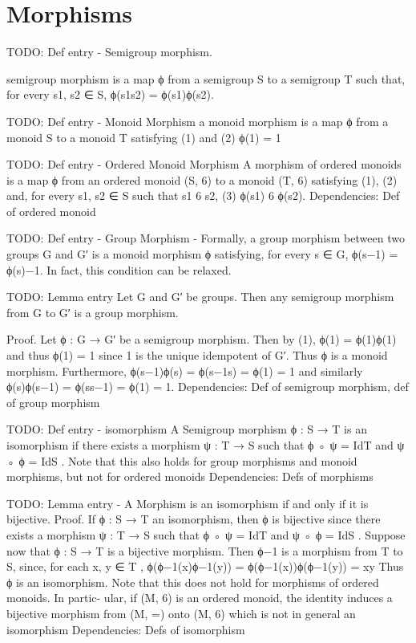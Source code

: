 \chapter {Morphisms}

TODO: Def entry - Semigroup morphism.

 semigroup morphism is a map ϕ from a
semigroup S to a semigroup T such that, for every s1, s2 ∈ S, 
ϕ(s1s2) = ϕ(s1)ϕ(s2).

TODO: Def entry - Monoid Morphism
a monoid morphism is a map ϕ from a monoid S to a monoid T
satisfying (1) and
(2) ϕ(1) = 1

TODO: Def entry - Ordered Monoid Morphism
A morphism of ordered monoids is a map ϕ from an ordered monoid (S, 6) to
a monoid (T, 6) satisfying (1), (2) and, for every s1, s2 ∈ S such that s1 6 s2,
(3) ϕ(s1) 6 ϕ(s2).
Dependencies: Def of ordered monoid

TODO: Def entry - Group Morphism - Formally, a group morphism between two groups G and G′ is a monoid morphism
ϕ satisfying, for every s ∈ G, ϕ(s−1) = ϕ(s)−1. In fact, this condition can be
relaxed. 

TODO: Lemma entry 
Let G and G′ be groups. Then any semigroup morphism
from G to G′ is a group morphism.

Proof. Let ϕ : G → G′ be a semigroup morphism. Then by (1), ϕ(1) = ϕ(1)ϕ(1)
and thus ϕ(1) = 1 since 1 is the unique idempotent of G′. Thus ϕ is a monoid
morphism. Furthermore, ϕ(s−1)ϕ(s) = ϕ(s−1s) = ϕ(1) = 1 and similarly
ϕ(s)ϕ(s−1) = ϕ(ss−1) = ϕ(1) = 1.
Dependencies: Def of semigroup morphism, def of group morphism

TODO: Def entry - isomorphism
 A Semigroup morphism ϕ : S → T is an isomorphism if there exists a morphism ψ :
T → S such that ϕ ◦ ψ = IdT and ψ ◦ ϕ = IdS .
Note that this also holds for group morphisms and monoid morphisms, but not for ordered monoids
Dependencies: Defs of morphisms

TODO: Lemma entry - A Morphism is an isomorphism if and only if it is bijective.
Proof. If ϕ : S → T an isomorphism, then ϕ is bijective since there exists a
morphism ψ : T → S such that ϕ ◦ ψ = IdT and ψ ◦ ϕ = IdS .
Suppose now that ϕ : S → T is a bijective morphism. Then ϕ−1 is a
morphism from T to S, since, for each x, y ∈ T ,
ϕ(ϕ−1(x)ϕ−1(y)) = ϕ(ϕ−1(x))ϕ(ϕ−1(y)) = xy
Thus ϕ is an isomorphism.
Note that this does not hold for morphisms of ordered monoids. 
 In partic-
ular, if (M, 6) is an ordered monoid, the identity induces a bijective morphism
from (M, =) onto (M, 6) which is not in general an isomorphism
Dependencies: Defs of isomorphism

